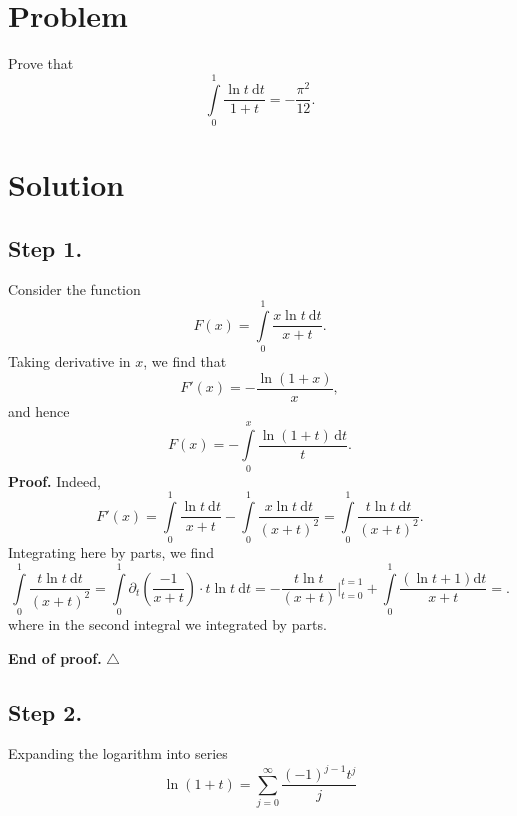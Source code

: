 \documentclass[10pt]{article}
\renewcommand{\d}{\mathrm{d}}
\renewcommand{\(}{\left(}
\renewcommand{\)}{\right)}
\begin{document}
\section{Problem}
Prove that
\[
\int\limits_{0}^{1}
\frac{\ln t\ \d t}{1+t} = -\frac{\pi^2}{12}.
\]

\section{Solution}
\subsection{Step 1.}
Consider the function
\[
F(x) = \int\limits_{0}^{1}
\frac{x\ln t\ \d t}{x+t}.
\]
Taking derivative in $x$, we find that
\[F'(x) = -\frac{\ln (1+x)}{x},\]
and hence
\begin{equation}\label{F}
F(x)=-\int\limits_0^{x}\frac{\ln(1+t)\,\d t}{t}.
\end{equation}
\textbf{Proof.}
Indeed,
\[
F'(x) = \int\limits_{0}^{1}
\frac{\ln t\ \d t}{x+t}
-
\int\limits_{0}^{1}
\frac{x\ln t\ \d t}{(x+t)^2}
=
\int\limits_{0}^{1}
\frac{t\ln t\ \d t}{(x+t)^2}.
\]
Integrating here by parts, we find
\[
\int\limits_{0}^{1}
\frac{t\ln t\ \d t}{(x+t)^2}
=
\int\limits_{0}^{1}\partial_t\(\frac{-1}{x+t}\)
\cdot t\ln t\ \d t
=
-\frac{t\ln t}{(x+t)}\Big|_{t=0}^{t=1}+
\int\limits_0^1\frac{(\ln t + 1)\d t}{x+t}
=.
\]
where in the second integral we integrated by parts.

\noindent\textbf{End of proof. }\hfill$\triangle$
\subsection{Step 2.}
Expanding the logarithm into series
\[\ln (1+t)=\sum\limits_{j=0}^{\infty}\frac{(-1)^{j-1}t^{j}}{j}\]
\end{document}
